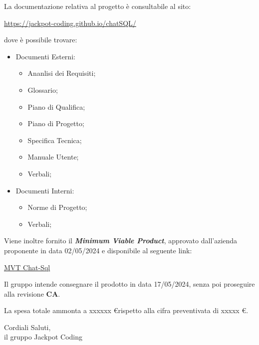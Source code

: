 \documentclass[5pt]{article}
\begin{document}
\begin{flushleft}
La documentazione relativa al progetto è consultabile al sito:
\begin{center}
	\href{https://jackpot-coding.github.io/chatSQL/}{https://jackpot-coding.github.io/chatSQL/}
\end{center}
dove è possibile trovare:
\begin{itemize}
	\item Documenti Esterni:
	\begin{itemize}
		\item Ananlisi dei Requisiti;
		\item Glossario;
		\item Piano di Qualifica;
		\item Piano di Progetto;
		\item Specifica Tecnica;
		\item Manuale Utente;
		\item Verbali;
	\end{itemize}
	\item Documenti Interni:
	\begin{itemize}
		\item Norme di Progetto;
		\item Verbali;
	\end{itemize}
\end{itemize}
\end{flushleft}

\begin{flushleft}
Viene inoltre fornito il \textbf{\textit{Minimum Viable Product}}, approvato dall'azienda proponente in data 02/05/2024 e disponibile al seguente link:
\begin{center}
	\href{https://github.com/Jackpot-Coding/chatSQL/tree/dev}{MVT Chat-Sql}
\end{center}
\end{flushleft}

\begin{flushleft}
Il gruppo intende consegnare il prodotto in data 17/05/2024, senza poi proseguire alla revisione \textbf{CA}.

La spesa totale ammonta a xxxxxx \euro rispetto alla cifra preventivata di xxxxx \euro.
\end{flushleft}

\vspace{8mm}

\begin{flushright}
	Cordiali Saluti,\\
	il gruppo Jackpot Coding
\end{flushright}
	
\end{document}
